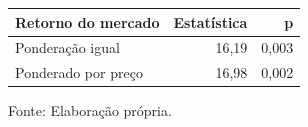 \begingroup
\setlength{}
\setlength{}
\fontsize{12.0pt}{14.4pt}\selectfont

\setlength{\LTpost}{0mm}
\begin{longtable}{@{\extracolsep{\fill}}lrr}

\toprule
\textbf{Retorno do mercado} & \textbf{Estatística} & \textbf{p} \\ 
\midrule\addlinespace[2.5pt]
Ponderação igual & 16,19 & 0,003 \\
Ponderado por preço & 16,98 & 0,002 \\
\bottomrule
\end{longtable}
\begin{minipage}{\linewidth}
Fonte: Elaboração própria.\\
\end{minipage}
\endgroup
